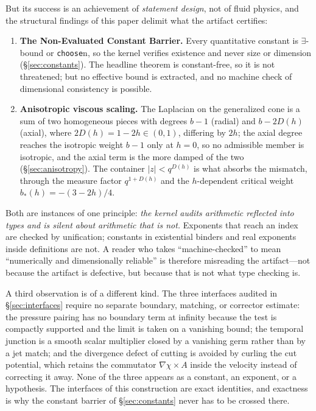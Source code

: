 \documentclass[11pt]{article}
\newcommand{\ct}[1]{\texttt{#1}}
\theoremstyle{plain}
\theoremstyle{definition}
\theoremstyle{remark}
\begin{document}
But its success is an achievement of \emph{statement design}, not of fluid
physics, and the structural findings of this paper delimit what the artifact
certifies:

\begin{enumerate}
\item \textbf{The Non-Evaluated Constant Barrier.} Every quantitative constant
is $\exists$-bound or \ct{choose}n, so the kernel verifies existence and never
size or dimension (\S\ref{sec:constants}). The headline theorem is
constant-free, so it is not threatened; but no effective bound is extracted, and
no machine check of dimensional consistency is possible.
\item \textbf{Anisotropic viscous scaling.} The Laplacian on the generalized
cone is a sum of two homogeneous pieces with degrees $b-1$ (radial) and
$b-2D(h)$ (axial), where $2D(h)=1-2h\in(0,1)$, differing by $2h$; the axial
degree reaches the isotropic weight $b-1$ only at $h=0$, so no admissible member is isotropic, and the axial
term is the more damped of the two
(\S\ref{sec:anisotropy}). The container $|z|<q^{D(h)}$ is what absorbs the
mismatch, through the measure factor $q^{1+D(h)}$ and the $h$-dependent
critical weight $b_{*}(h)=-(3-2h)/4$.
\end{enumerate}

Both are instances of one principle: \emph{the kernel audits arithmetic
reflected into types and is silent about arithmetic that is not.} Exponents that
reach an index are checked by unification; constants in existential binders and
real exponents inside definitions are not. A reader who takes ``machine-checked''
to mean ``numerically and dimensionally reliable'' is therefore misreading the
artifact---not because the artifact is defective, but because that is not what
type checking is.

A third observation is of a different kind. The three interfaces audited in
\S\ref{sec:interfaces} require no separate boundary, matching, or corrector
estimate: the pressure pairing has no boundary
term at infinity because the test is compactly supported and the limit is taken
on a vanishing bound; the temporal junction is a smooth scalar multiplier closed
by a vanishing germ rather than by a jet match; and the divergence defect of
cutting is avoided by curling the cut potential, which retains the commutator
$\nabla\chi\times A$ inside the velocity instead of correcting it away. None of
the three appears as a constant, an exponent, or a hypothesis. The interfaces of
this construction are exact identities, and exactness is why the
constant barrier of \S\ref{sec:constants} never has to be crossed there.
\end{document}
